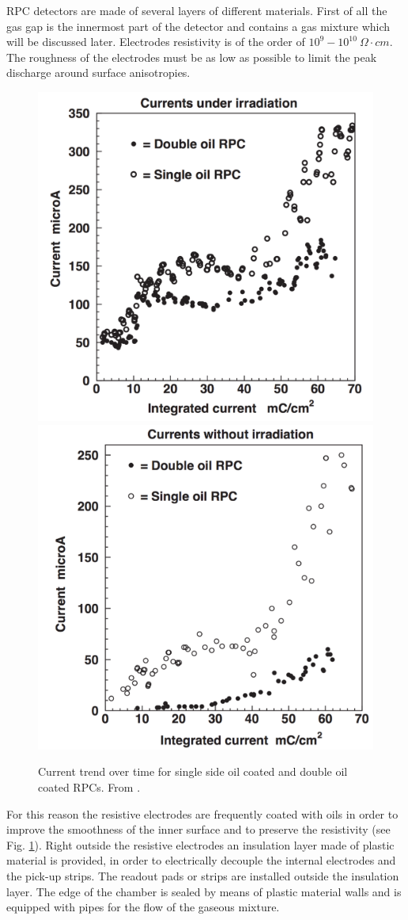 RPC detectors are made of several layers of different materials.
First of all the gas gap is the innermost part of the detector and contains a gas mixture which will be discussed later.
Electrodes resistivity is of the order of $10^{9}-10^{10}\ \Omega \cdot cm$.
The roughness of the electrodes must be as low as possible to limit the peak discharge around surface anisotropies.


\begin{figure}[!t]
\begin{center}
\includegraphics[width=0.47\linewidth]{Chapters/Performance/Figs/oil_irradiation.pdf}
\includegraphics[width=0.47\linewidth]{Chapters/Performance/Figs/oil_no_irradiation.pdf}
\caption{Current trend over time for single side oil coated and double oil coated RPCs. From \cite{aliceRPC:2004}.}
\label{fig:RPCoil}
\end{center}
\end{figure}

For this reason the resistive electrodes are frequently coated with oils in order to improve the smoothness of the inner surface and to preserve the resistivity (see Fig. \ref{fig:RPCoil}).
Right outside the resistive electrodes an insulation layer made of plastic material is provided, in order to electrically decouple the internal electrodes and the pick-up strips.
The readout pads or strips are installed outside the insulation layer.
The edge of the chamber is sealed  by means of plastic material walls and is equipped with pipes for the flow of the gaseous mixture.

